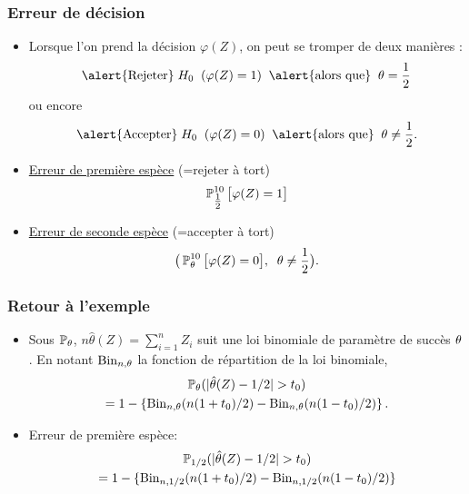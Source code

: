 \begin{frame}
\frametitle{Erreur de décision}
\begin{itemize}
\item
Lorsque l'on prend la décision $\varphi(Z)$, on peut se \alert{tromper de deux manières} :
$$\text{\alert{Rejeter}}\; H_0\;\;(\varphi(Z)=1)\;\;\text{\alert{alors que}}\;\;\truetheta = \frac{1}{2}$$
ou encore
$$\text{\alert{Accepter}}\;H_0\;\;(\varphi(Z)=0)\;\;\text{\alert{alors que}}\;\;\truetheta  \neq \frac{1}{2}.$$
\item \underline{Erreur de première espèce}  \alert{(=rejeter à tort)}
$$\operatorname{{\mathbb P}}_{\tfrac{1}{2}}^{10}\big[\varphi(Z)=1\big]$$
\item \underline{Erreur de seconde espèce}  \alert{(=accepter à tort)}
$$\big(\operatorname{{\mathbb P}}_\theta^{10}\big[\varphi(Z)=0\big],\;\;\theta \neq \frac{1}{2}\big).$$
\end{itemize}
\end{frame}


\begin{frame}
\frametitle{Retour à l'exemple}
\begin{itemize}
\item Sous $\operatorname{{\mathbb P}}_\theta$, $n \hat{\theta}(Z)= \sum_{i=1}^n Z_i$ suit une loi binomiale de paramètre de succès $\theta$.
En notant $\mathrm{Bin}_{n,\theta}$ la fonction
de répartition de la loi binomiale,
\begin{multline*}
\operatorname{{\mathbb P}}_\theta( |\hat{\theta}(Z) - 1/2| > t_0 ) \\
= 1 - \{\mathrm{Bin}_{n,\theta}(n(1+t_0)/2) - \mathrm{Bin}_{n,\theta}(n(1-t_0)/2)  \} \,.
\end{multline*}
\item \alert{Erreur de première espèce}:
\begin{multline*}
\operatorname{{\mathbb P}}_{1/2}(|\hat{\theta}(Z) - 1/2| > t_0) \\= 1 - \{ \mathrm{Bin}_{n,1/2}(n(1+t_0)/2) - \mathrm{Bin}_{n,1/2}(n(1-t_0)/2)  \}
\end{multline*}
\end{itemize}
\end{frame}

